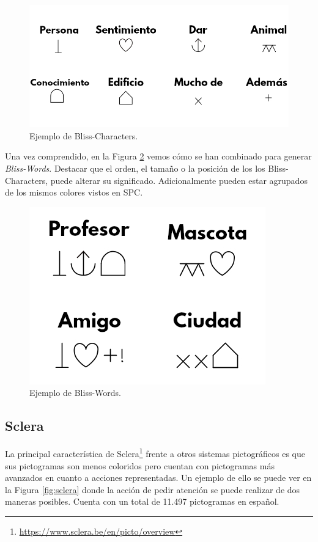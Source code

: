 \begin{figure}[h!]
	\centering
	\includegraphics[width=0.8\linewidth]{Imagenes/Bitmap/BlissCharacters}
	\caption[Ejemplo de Bliss-Characters]{Ejemplo de Bliss-Characters.}
	\label{fig:blisscharacters}
\end{figure}
Una vez comprendido, en la Figura \ref{fig:blissword} vemos cómo se han combinado para generar \textit{Bliss-Words}. Destacar que el orden, el tamaño o la posición de los los Bliss-Characters, puede alterar su significado. Adicionalmente pueden estar agrupados de los mismos colores vistos en SPC.

\begin{figure}[h!]
	\centering
	\includegraphics[width=0.4\linewidth]{Imagenes/Bitmap/BlissWord}
	\caption[Ejemplo de Bliss-Words]{Ejemplo de Bliss-Words.}
	\label{fig:blissword}
\end{figure}



\subsection{Sclera}
La principal característica de Sclera\footnote{\url{https://www.sclera.be/en/picto/overview}} frente a otros sistemas pictográficos es que sus pictogramas son menos coloridos pero cuentan con pictogramas más avanzados en cuanto a acciones representadas. Un ejemplo de ello se puede ver en la Figura \ref{fig:sclera} donde la acción de pedir atención se puede realizar de dos maneras posibles. Cuenta con un total de 11.497 pictogramas en español.

